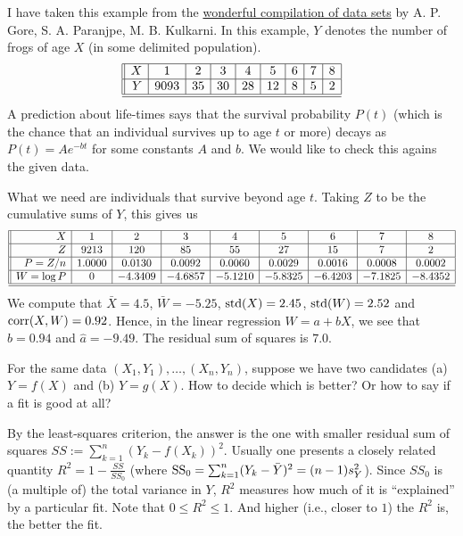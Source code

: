 \documentclass[preprint,  11pt]{amsart}
\begin{document}
\beg I have taken this example from the \href{http://ces.iisc.ernet.in/hpg/nvjoshi/statspunedatabook/databook.html}{ wonderful compilation of data sets} by A. P. Gore, S. A. Paranjpe, M. B. Kulkarni. In this example, $Y$ denotes the number of frogs of age $X$ (in some delimited population).
\[
\begin{array}{||r|c|c|c|c|c|c|c|c|c|c|c|c|c||}
\hline
X  & 1 & 2 & 3 & 4 & 5 & 6 & 7 & 8  \\
\hline
Y  & 9093 & 35 & 30 & 28 & 12 & 8 & 5 & 2\\
\hline
\hline
\end{array}
\]
A prediction about life-times says that the survival probability $P(t)$ (which is the chance that an individual survives up to age $t$ or more) decays as $P(t)=Ae^{-bt}$ for some constants $A$ and $b$. We would like to check this agains the given data.

What we need are individuals that survive beyond age $t$. Taking $Z$ to be the cumulative sums of $Y$, this gives us
\[
\begin{array}{||r|c|c|c|c|c|c|c|c|c|c|c|c|c||}
\hline
X  & 1 & 2 & 3 & 4 & 5 & 6 & 7 & 8  \\
\hline
Z  & 9213 &  120 & 85 & 55 & 27 & 15 & 7 & 2\\
\hline
P=Z/n & 1.0000  &  0.0130 &   0.0092  &  0.0060  &  0.0029  &  0.0016  &  0.0008  &  0.0002 \\
\hline
W=\log P &  0  & -4.3409  & -4.6857 &  -5.1210  & -5.8325  & -6.4203 &  -7.1825 &  -8.4352 \\
\hline
\hline
\end{array}
\]
We compute that $\bar{X}=4.5$, $\bar{W}=-5.25$, $\mbox{std}(X)=2.45$, $\mbox{std}(W)= 2.52$ and $\mbox{corr}(X,W)=0.92$. Hence, in the linear regression $W=a+bX$, we see that $\hat{b}=0.94$ and $\hat{a}=-9.49$. The residual sum of squares is $7.0$.
\eeg

 For the same data $(X_{1},Y_{1}),\ldots ,(X_{n},Y_{n})$, suppose we have two candidates \; (a) \; $Y=f(X)$ and \; (b) \; $Y=g(X)$. How to decide which is better? Or how to say if a fit is good at all?

By the least-squares criterion, the answer is  the one with smaller residual sum of squares $SS:=\sum_{k=1}^{n}(Y_{k}-f(X_{k}))^{2}$. Usually one presents a closely related quantity $R^{2}=1-\frac{SS}{SS_{0}}$ (where $\mbox{SS}_{0}=\sum_{k=1}^{n}(Y_{k}-\bar{Y})^{2}=(n-1)s_{Y}^{2}$). Since $SS_{0}$ is (a multiple of) the total variance in $Y$, $R^{2}$ measures how much of it is ``explained'' by a particular fit. Note that $0\le R^{2}\le 1$. And higher (i.e., closer to $1$) the $R^{2}$ is, the better the fit.
\end{document}
